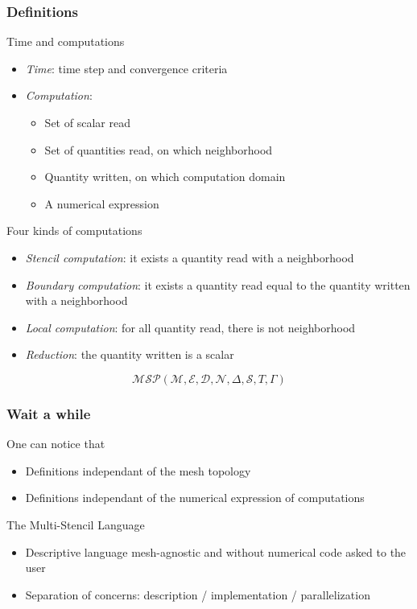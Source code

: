 \documentclass{beamer}
\begin{document}
\begin{frame}
\frametitle{Definitions}
\begin{block}{Time and computations}
\begin{itemize}
\item \textit{Time}: time step and convergence criteria
\item \textit{Computation}:
\begin{itemize}
\item Set of scalar read
\item Set of quantities read, on which neighborhood
\item Quantity written, on which computation domain
\item A numerical expression
\end{itemize}
\end{itemize}
\end{block}

\begin{block}{Four kinds of computations}
\begin{itemize}
\item \textit{Stencil computation}: it exists a quantity read with a neighborhood
\item \textit{Boundary computation}: it exists a quantity read equal to the quantity written with a neighborhood
\item \textit{Local computation}: for all quantity read, there is not neighborhood
\item \textit{Reduction}: the quantity written is a scalar
\end{itemize}
\end{block}

\begin{equation*}
\mathcal{MSP}(\mathcal{M},\mathcal{E},\mathcal{D},\mathcal{N},\Delta,\mathcal{S},T,\Gamma)
\end{equation*}
\end{frame}
\begin{frame}
\frametitle{Wait a while}
One can notice that
\begin{itemize}
\item Definitions independant of the mesh topology
\item Definitions independant of the numerical expression of computations
\end{itemize}
\begin{block}{The Multi-Stencil Language}
\begin{itemize}
\item Descriptive language mesh-agnostic and without numerical code asked to the user
\item Separation of concerns: description / implementation / parallelization
\end{itemize}
\end{block}
\end{frame}
\end{document}
